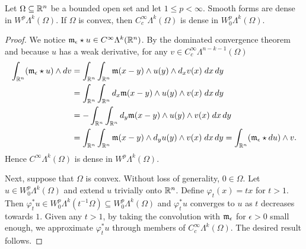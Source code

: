 \documentclass[10pt,a4paper]{article}
\newcommand{\mwl}[1]{{\color{red}#1}}
\begin{document}

\begin{lemma}
    Let $\Omega \subseteq {\mathbb R}^{n}$ be a bounded open set and let $1 \leq p < \infty$. 
    Smooth forms are dense in $W^{p}\Lambda^{k}(\Omega)$.
    If $\Omega$ is convex, then $C^{\infty}_{c}\Lambda^{k}(\Omega)$ is dense in $W^{p}_{0}\Lambda^{k}(\Omega)$. 
\end{lemma}
\begin{proof}
    We notice ${\mathfrak m}_{\epsilon} \star u \in C^{\infty}\Lambda^{k}({\mathbb R}^{n})$. 
    By the dominated convergence theorem and because $u$ has a weak derivative,
    for any $v \in C^{\infty}_{c}\Lambda^{n-k-1}(\Omega)$
    \begin{align*}
        \int_{{\mathbb R}^{n}} ( {\mathfrak m}_{\epsilon} \star u ) \wedge d v 
        &= 
        \int_{{\mathbb R}^{n}} \int_{{\mathbb R}^{n}} {\mathfrak m}(x-y) \wedge u(y) \wedge d_{x} v(x) \;dx\,dy
        \\&= 
        \int_{{\mathbb R}^{n}} \int_{{\mathbb R}^{n}} d_x{\mathfrak m}(x-y) \wedge u(y) \wedge v(x) \;dx\,dy
        \\&= 
        - \int_{{\mathbb R}^{n}} \int_{{\mathbb R}^{n}} d_y{\mathfrak m}(x-y) \wedge u(y) \wedge v(x) \;dx\,dy
        \\&= 
        \int_{{\mathbb R}^{n}} \int_{{\mathbb R}^{n}} {\mathfrak m}(x-y) \wedge d_y u(y) \wedge v(x) \;dx\,dy
        = 
        \int_{{\mathbb R}^{n}} ( {\mathfrak m}_{\epsilon} \star d u ) \wedge v 
        .
    \end{align*}
    Hence $C^{\infty}\Lambda^{k}(\Omega)$ is dense in $W^{p}\Lambda^{k}(\Omega)$.
    
    Next, suppose that $\Omega$ is convex. Without loss of generality, $0 \in \Omega$. 
    Let $u \in W^{p}_{0}\Lambda^{k}(\Omega)$ and extend $u$ trivially onto ${\mathbb R}^{n}$. 
    Define $\varphi_t(x) = tx$ for $t > 1$. 
    Then $\varphi_{t}^{\ast} u \in W^{p}_{0}\Lambda^{k}(t^{-1}\Omega) \subseteq W^{p}_{0}\Lambda^{k}(\Omega)$ 
    and $\varphi_{t}^{\ast} u$ converges to $u$ as $t$ decreases towards $1$. 
    Given any $t > 1$, by taking the convolution with ${\mathfrak m}_{\epsilon}$ for $\epsilon > 0$ small enough,
    we approximate $\varphi_{t}^{\ast} u$ through members of $C^{\infty}_{c}\Lambda^{k}(\Omega)$.
    The desired result follows. 
\end{proof}
\end{document}
